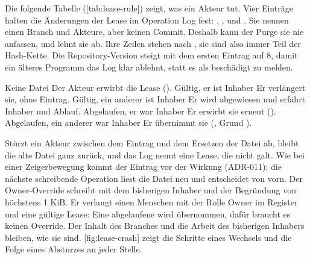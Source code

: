 Die folgende Tabelle ([tab:lease-rule]) zeigt, was ein Akteur tut.
Vier Einträge halten die Änderungen der Lease im Operation Log fest:
, ,  und .
Sie nennen einen Branch und Akteure, aber keinen Commit.
Deshalb kann der Purge sie nie anfassen, und  lehnt sie ab.
Ihre Zeilen stehen nach , sie sind also immer Teil der Hash-Kette.
Die Repository-Version steigt mit dem ersten Eintrag auf 8, damit ein älteres Programm das Log
klar ablehnt, statt es als beschädigt zu melden.

\startplacetable[title={Was ein Akteur tut, der einen Branch schreiben will},
reference=tab:lease-rule]
\startxtable[frame=off,option=stretch]
\startxrow[topframe=on,bottomframe=on]
 \stopxcell
{} \stopxcell
\stopxrow
\startxrow
\startxcell Keine Datei \stopxcell
\startxcell Der Akteur erwirbt die Lease (). \stopxcell
\stopxrow
\startxrow
\startxcell Gültig, er ist Inhaber \stopxcell
\startxcell Er verlängert sie, ohne Eintrag. \stopxcell
\stopxrow
\startxrow
\startxcell Gültig, ein anderer ist Inhaber \stopxcell
\startxcell Er wird abgewiesen und erfährt Inhaber und Ablauf. \stopxcell
\stopxrow
\startxrow
\startxcell Abgelaufen, er war Inhaber \stopxcell
\startxcell Er erwirbt sie erneut (). \stopxcell
\stopxrow
\startxrow[bottomframe=on]
\startxcell Abgelaufen, ein anderer war Inhaber \stopxcell
\startxcell Er übernimmt sie (, Grund
). \stopxcell
\stopxrow
\stopxtable
\stopplacetable

Stürzt ein Akteur zwischen dem Eintrag und dem Ersetzen der Datei ab, bleibt die alte Datei ganz
zurück, und das Log nennt eine Lease, die nicht galt.
Wie bei einer Zeigerbewegung kommt der Eintrag vor der Wirkung (ADR-011);
die nächste schreibende Operation liest die Datei neu und entscheidet von vorn.
Der Owner-Override schreibt  mit dem bisherigen Inhaber und der Begründung
von höchstens 1 KiB.
Er verlangt einen Menschen mit der Rolle Owner im Register und eine gültige Lease:
Eine abgelaufene wird übernommen, dafür braucht es keinen Override.
Der Inhalt des Branches und die Arbeit des bisherigen Inhabers bleiben, wie sie sind.
[fig:lease-crash] zeigt die Schritte eines Wechsels und die Folge eines Absturzes
an jeder Stelle.

\startplacefigure[title={Wechsel einer Lease mit Absturzpunkten},
    reference=fig:lease-crash,location=here]
\stopplacefigure

